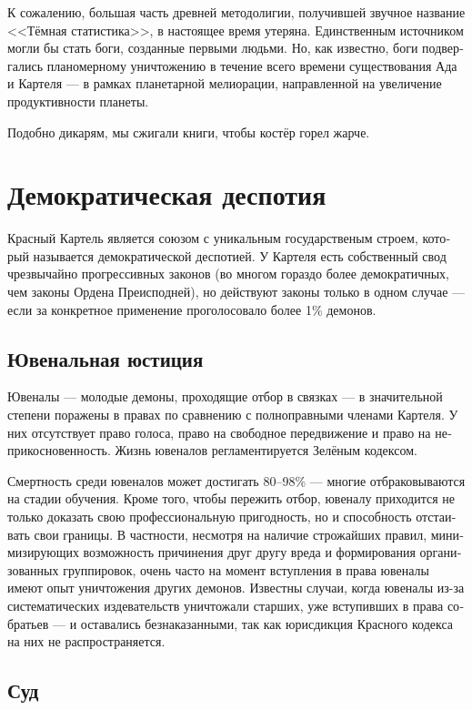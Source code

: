 \documentclass[a4paper,12pt,fleqn]{book}\usepackage{polyglossia}\setdefaultlanguage[babelshorthands=true]{russian}\setotherlanguage{english}\defaultfontfeatures{Ligatures=TeX,Mapping=tex-text}\usepackage{xcolor}\newcommand{\ml}[3]{#2}
\begin{document}
{К сожалению, большая часть древней методолигии, получившей звучное название <<Тёмная статистика>>, в настоящее время утеряна.
Единственным источником могли бы стать боги, созданные первыми людьми.
Но, как известно, боги подвергались планомерному уничтожению в течение всего времени существования Ада и Картеля --- в рамках планетарной мелиорации, направленной на увеличение продуктивности планеты.

Подобно дикарям, мы сжигали книги, чтобы костёр горел жарче.

\section{Демократическая деспотия}

Красный Картель является союзом с уникальным государственым строем, который называется демократической деспотией.
У Картеля есть собственный свод чрезвычайно прогрессивных законов (во многом гораздо более демократичных, чем законы Ордена Преисподней), но действуют законы только в одном случае --- если за конкретное применение проголосовало более 1\% демонов.

\subsection{Ювенальная юстиция}

Ювеналы --- молодые демоны, проходящие отбор в связках --- в значительной степени поражены в правах по сравнению с полноправными членами Картеля.
У них отсутствует право голоса, право на свободное передвижение и право на неприкосновенность.
Жизнь ювеналов регламентируется Зелёным кодексом.

Смертность среди ювеналов может достигать 80--98\% --- многие отбраковываются на стадии обучения.
Кроме того, чтобы пережить отбор, ювеналу приходится не только доказать свою профессиональную пригодность, но и способность отстаивать свои границы.
В частности, несмотря на наличие строжайших правил, минимизирующих возможность причинения друг другу вреда и формирования организованных группировок, очень часто на момент вступления в права ювеналы имеют опыт уничтожения других демонов.
Известны случаи, когда ювеналы из-за систематических издевательств уничтожали старших, уже вступивших в права собратьев --- и оставались безнаказанными, так как юрисдикция Красного кодекса на них не распространяется.

\subsection{Суд}

}
\end{document}
